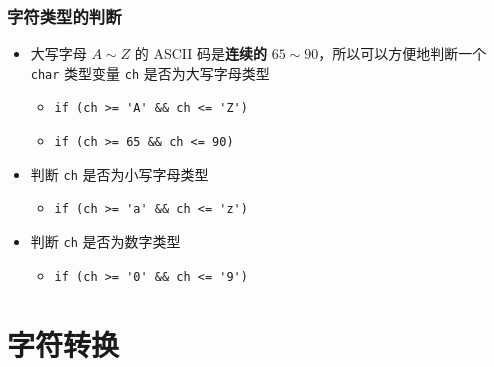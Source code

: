 \begin{frame}[fragile]
    \frametitle{字符类型的判断}

    \begin{itemize}
        \item 大写字母 $A \sim Z$ 的 ASCII 码是\textbf{连续的} $65 \sim 90$，所以可以方便地判断一个 \lstinline|char| 类型变量 \lstinline|ch| 是否为大写字母类型
        
        \begin{itemize}
            \item<2-> \lstinline|if (ch >= 'A' && ch <= 'Z')|
            \item<2-> \lstinline|if (ch >= 65 && ch <= 90)|
        \end{itemize}

        \item<3-> 判断 \lstinline|ch| 是否为小写字母类型
        
        \begin{itemize}
            \item<4-> \lstinline|if (ch >= 'a' && ch <= 'z')|
        \end{itemize}

        \item<5-> 判断 \lstinline|ch| 是否为数字类型
        
        \begin{itemize}
            \item<6-> \lstinline|if (ch >= '0' && ch <= '9')|
        \end{itemize}

    \end{itemize}

\end{frame}


\section{字符转换}

